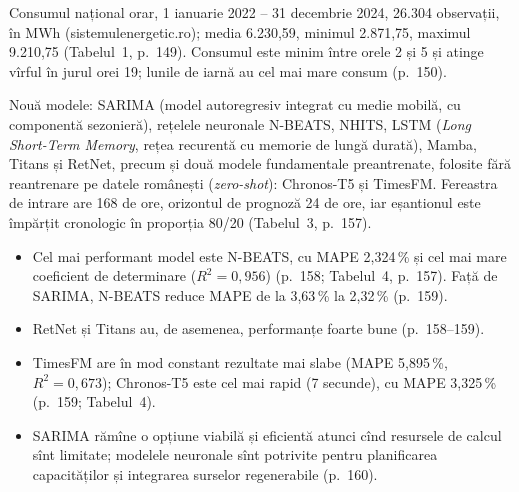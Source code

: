 \textbf{} %
{Consumul național orar, 1 ianuarie 2022 -- 31 decembrie 2024, 26.304 observații, în MWh (sistemulenergetic.ro); media 6.230,59, minimul 2.871,75, maximul 9.210,75 (Tabelul~1, p.~149).
Consumul este minim între orele 2 și 5 și atinge vîrful în jurul orei 19; lunile de iarnă au cel mai mare consum (p.~150).}

\textbf{} %
{Nouă modele: SARIMA (model autoregresiv integrat cu medie mobilă, cu componentă sezonieră), rețelele neuronale N-BEATS, NHITS, LSTM (\emph{Long Short-Term Memory}, rețea recurentă cu memorie de lungă durată), Mamba, Titans și RetNet,
precum și două modele fundamentale preantrenate, folosite fără reantrenare pe datele românești (\emph{zero-shot}): Chronos-T5 și TimesFM. Fereastra de intrare are 168 de ore, orizontul de prognoză 24 de ore, iar eșantionul este împărțit cronologic în proporția 80/20 (Tabelul~3, p.~157).}

\textbf{}
\begin{itemize}
\item {}%
{Cel mai performant model este N-BEATS, cu MAPE 2,324\,\% și cel mai mare coeficient de determinare ($R^2 = 0{,}956$) (p.~158; Tabelul~4, p.~157).
Față de SARIMA, N-BEATS reduce MAPE de la 3,63\,\% la 2,32\,\% (p.~159).}
\item {}%
{RetNet și Titans au, de asemenea, performanțe foarte bune (p.~158--159).}
\item {}%
{TimesFM are în mod constant rezultate mai slabe (MAPE 5,895\,\%, $R^2 = 0{,}673$); Chronos-T5 este cel mai rapid (7 secunde), cu MAPE 3,325\,\% (p.~159; Tabelul~4).}
\item {}%
{SARIMA rămîne o opțiune viabilă și eficientă atunci cînd resursele de calcul sînt limitate; modelele neuronale sînt potrivite pentru planificarea capacităților și integrarea surselor regenerabile (p.~160).}
\end{itemize}

